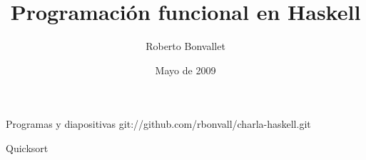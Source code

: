 \documentclass[12pt]{beamer}
\title {Programación funcional en Haskell}
\author{Roberto Bonvallet}
\institute[]{
    Departamento de Informática \\
    Universidad Técnica Federico Santa María
}
\date{Mayo de 2009}
\begin{document}
\begin{frame}
    \titlepage
\end{frame}

\begin{frame}
    \begin{block}{Programas y diapositivas}
        git://github.com/rbonvall/charla-haskell.git
    \end{block}
\end{frame}
    
\begin{frame}[fragile]
    
\end{frame}

\begin{frame}[fragile]
    
\end{frame}

\begin{frame}[fragile]
    
\end{frame}

\begin{frame}[fragile]
    
\end{frame}

\begin{frame}[fragile]
    \begin{block}{Quicksort}
        
    \end{block}
\end{frame}
\end{document}
